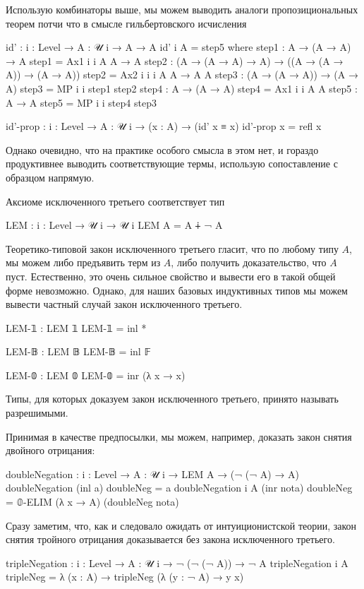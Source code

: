 \documentclass{article}[12pt]
\begin{document}
Использую комбинаторы выше, мы можем выводить аналоги пропозициональных теорем потчи что
в смысле гильбертовского исчисления
\begin{code}
id' : {i : Level} → {A : 𝒰 i} → A → A
id' {i} {A} = step5
    where
        step1 : A → (A → A) → A
        step1 = Ax1 {i} {i} {A} {A → A}
        step2 : (A → (A → A) → A) → ((A → (A → A)) → (A → A))
        step2 = Ax2 {i} {i} {i} {A} {A → A} {A}
        step3 : (A → (A → A)) → (A → A)
        step3 = MP {i} {i} step1 step2
        step4 : A → (A → A)
        step4 = Ax1 {i} {i} {A} {A}
        step5 : A → A
        step5 = MP {i} {i} step4 step3

id'-prop : {i : Level} → {A : 𝒰 i}
           → (x : A) → (id' x ≡ x)
id'-prop x = refl x
\end{code}
Однако очевидно, что на практике особого смысла в этом нет, и гораздо продуктивнее
выводить соответствующие термы, использую сопоставление с образцом напрямую.

Аксиоме исключенного третьего соответствует тип
\begin{code}
LEM : {i : Level} → 𝒰 i → 𝒰 i
LEM A = A ∔ ¬ A
\end{code}
Теоретико-типовой закон исключенного третьего гласит, что по любому типу $A$, мы можем
либо предъявить терм из $A$, либо получить доказательство, что $A$ пуст. Естественно,
это очень сильное свойство и вывести его в такой общей форме невозможно. Однако, для наших
базовых индуктивных типов мы можем вывести частный случай закон исключенного третьего.
\begin{code}
LEM-𝟙 : LEM 𝟙
LEM-𝟙 = inl *

LEM-𝔹 : LEM 𝔹
LEM-𝔹 = inl 𝔽

LEM-𝟘 : LEM 𝟘
LEM-𝟘 = inr (λ x → x)
\end{code}
Типы, для которых доказуем закон исключенного третьего, принято называть разрешимыми.

Принимая  в качестве предпосылки, мы можем, например, доказать
закон снятия двойного отрицания:
\begin{code}
doubleNegation : {i : Level} → {A : 𝒰 i} → LEM A → (¬ (¬ A) → A)
doubleNegation (inl a) doubleNeg = a
doubleNegation {i} {A} (inr nota) doubleNeg = 𝟘-ELIM (λ x → A) (doubleNeg nota)
\end{code}
Сразу заметим, что, как и следовало ожидать от интуиционистской теории, закон
снятия тройного отрицания доказывается без закона исключенного третьего.
\begin{code}
tripleNegation : {i : Level} → {A : 𝒰 i} → ¬ (¬ (¬ A)) → ¬ A
tripleNegation {i} {A} tripleNeg = λ (x : A)  → tripleNeg (λ (y : ¬ A) → y x)
\end{code}
\end{document}
